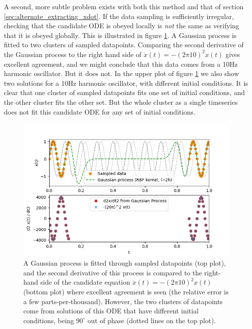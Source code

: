 \documentclass{article}
\begin{document}
A second, more subtle problem exists with both this method and that of section \ref{sec:alternate_extracting_xdot}. If the data sampling is sufficiently irregular, checking that the candidate ODE is obeyed locally is \emph{not} the same as verifying that it is obeyed globally.
This is illustrated in figure \ref{fig:gp_fitting}.
A Gaussian process is fitted to two clusters of sampled datapoints.
Comparing the second derivative of the Gaussian process to the right hand side of $\ddot{x}(t) = -(2\pi10)^2 x(t)$ gives excellent agreement, and we might conclude that this data comes from a 10Hz harmonic oscillator.
But it does not.
In the upper plot of figure \ref{fig:gp_fitting} we also show two solutions for a 10Hz harmonic oscillator, with different initial conditions.
It is clear that one cluster of sampled datapoints fits one set of initial conditions, and the other cluster fits the other set.
But the whole cluster as a single timeseries does not fit this candidate ODE for any set of initial conditions.

\begin{figure}
\includegraphics{images/alternative_methods/gp_fitting.png}
\centering
\caption{A Gaussian process is fitted through sampled datapoints (top plot), and the second derivative of this process is compared to the right-hand side of the candidate equation $\ddot{x}(t) = -(2\pi10)^2 x(t)$ (bottom plot) where excellent agreement is seen (the relative error is a few parts-per-thousand).
However, the two clusters of datapoints come from solutions of this ODE that have different initial conditions, being $90^{\circ}$ out of phase (dotted lines on the top plot).
}
\label{fig:gp_fitting}
\end{figure}
\end{document}
